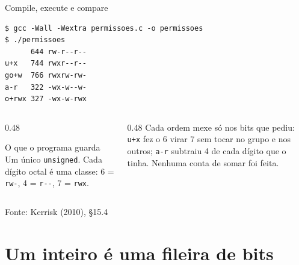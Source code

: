 \documentclass[aspectratio=169]{beamer}
\newcommand{\fonte}[1]{\vfill\hfill{\scriptsize\textcolor{UFSGray}{Fonte: #1}}}
\begin{document}
\begin{frame}[fragile]{Compile, execute e compare}
\begin{lstlisting}[style=shellStyle]
$ gcc -Wall -Wextra permissoes.c -o permissoes
$ ./permissoes
      644 rw-r--r--
u+x   744 rwxr--r--
go+w  766 rwxrw-rw-
a-r   322 -wx-w--w-
o+rwx 327 -wx-w-rwx
\end{lstlisting}
  \begin{columns}[T]
    \begin{column}{0.48\textwidth}
      \begin{block}{O que o programa guarda}
        \small Um único \texttt{unsigned}. Cada dígito octal é uma classe:
        6 = \texttt{rw-}, 4 = \texttt{r-{}-}, 7 = \texttt{rwx}.
      \end{block}
    \end{column}
    \begin{column}{0.48\textwidth}
      \small Cada ordem mexe só nos bits que pediu: \texttt{u+x} fez o 6
      virar 7 sem tocar no grupo e nos outros; \texttt{a-r} subtraiu 4 de cada
      dígito que o tinha. Nenhuma conta de somar foi feita.
    \end{column}
  \end{columns}
  \fonte{Kerrisk (2010), §15.4~\cite{kerrisk2010linux}}
\end{frame}

\section{Um inteiro é uma fileira de bits}
\end{document}
